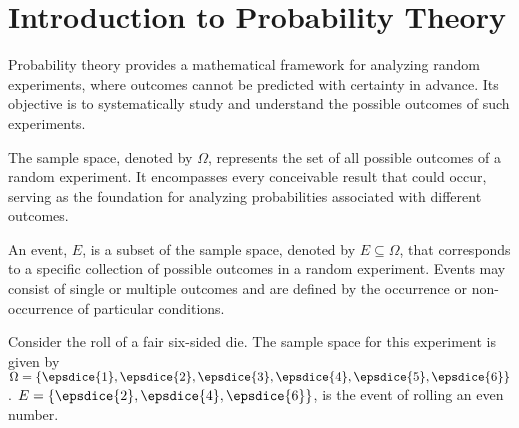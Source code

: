 \chapter{Introduction to Probability Theory}
\label{chp:probaiblity_theory}
Probability theory provides a mathematical framework for analyzing random experiments, where outcomes cannot be predicted with certainty in advance. Its objective is to systematically study and understand the possible outcomes of such experiments.
\begin{definition}
	The sample space, denoted by \( \Omega \), represents the set of all possible outcomes of a random experiment. It encompasses every conceivable result that could occur, serving as the foundation for analyzing probabilities associated with different outcomes.
\end{definition}

\begin{definition}[Event]
	An event, $E$, is a subset of the sample space, denoted by $E \subseteq \Omega$, that corresponds to a specific collection of possible outcomes in a random experiment. Events may consist of single or multiple outcomes and are defined by the occurrence or non-occurrence of particular conditions.
\end{definition}

\begin{example}
	\label{ex:die1}
	Consider the roll of a fair six-sided die. The sample space for this experiment is given by $\Omega = \{ \epsdice{1}, \epsdice{2}, \epsdice{3}, \epsdice{4}, \epsdice{5}, \epsdice{6} \}$. $E = \{\epsdice{2}, \epsdice{4}, \epsdice{6}\}$, is the event of rolling an even number. 
\end{example}

